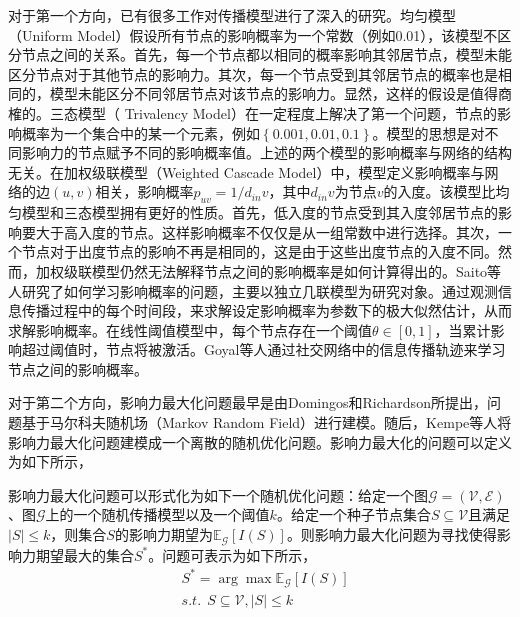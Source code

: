 对于第一个方向，已有很多工作对传播模型进行了深入的研究。均匀模型（Uniform Model）假设所有节点的影响概率为一个常数（例如0.01），该模型不区分节点之间的关系。首先，每一个节点都以相同的概率影响其邻居节点，模型未能区分节点对于其他节点的影响力。其次，每一个节点受到其邻居节点的概率也是相同的，模型未能区分不同邻居节点对该节点的影响力。显然，这样的假设是值得商榷的。三态模型（ Trivalency Model）在一定程度上解决了第一个问题，节点的影响概率为一个集合中的某一个元素，例如$\left\{ 0.001, 0.01, 0.1\right\}$。模型的思想是对不同影响力的节点赋予不同的影响概率值。上述的两个模型的影响概率与网络的结构无关。在加权级联模型（Weighted Cascade Model）中，模型定义影响概率与网络的边$\left(u,v\right)$相关，影响概率$p_{uv}=1/d_{in}v$，其中$d_{in}v$为节点$v$的入度。该模型比均匀模型和三态模型拥有更好的性质。首先，低入度的节点受到其入度邻居节点的影响要大于高入度的节点。这样影响概率不仅仅是从一组常数中进行选择。其次，一个节点对于出度节点的影响不再是相同的，这是由于这些出度节点的入度不同。然而，加权级联模型仍然无法解释节点之间的影响概率是如何计算得出的。Saito等人研究了如何学习影响概率的问题，主要以独立几联模型为研究对象。通过观测信息传播过程中的每个时间段，来求解设定影响概率为参数下的极大似然估计，从而求解影响概率。在线性阈值模型中，每个节点存在一个阈值$\theta \in \left[ 0,1 \right]$，当累计影响超过阈值时，节点将被激活。Goyal等人通过社交网络中的信息传播轨迹来学习节点之间的影响概率。

对于第二个方向，影响力最大化问题最早是由Domingos和Richardson所提出，问题基于马尔科夫随机场（Markov Random Field）进行建模。随后，Kempe等人将影响力最大化问题建模成一个离散的随机优化问题。影响力最大化的问题可以定义为如下所示，

\begin{defn}[影响力最大化问题]
\label{def:imProblem}
影响力最大化问题可以形式化为如下一个随机优化问题：给定一个图$\mathcal{G} = \left(\mathcal{V}, \mathcal{E}\right)$、图$\mathcal{G}$上的一个随机传播模型以及一个阈值$k$。给定一个种子节点集合$S \subseteq \mathcal{V}$且满足$\left\vert{S}\right\vert \leq k$，则集合$S$的影响力期望为$\mathbb{E}_\mathcal{G}\left[I\left(S\right)\right]$。则影响力最大化问题为寻找使得影响力期望最大的集合$S^{\ast}$。问题可表示为如下所示，
\begin{equation}
\label{eq:imProblem}
    \begin{split}
        &S^{\ast} = \arg\max{\mathbb{E}_\mathcal{G}\left[I\left(S\right)\right]}\\
        &s.t.~~S \subseteq \mathcal{V},\left\vert{S}\right\vert \leq k
    \end{split}
\end{equation}
\end{defn}

